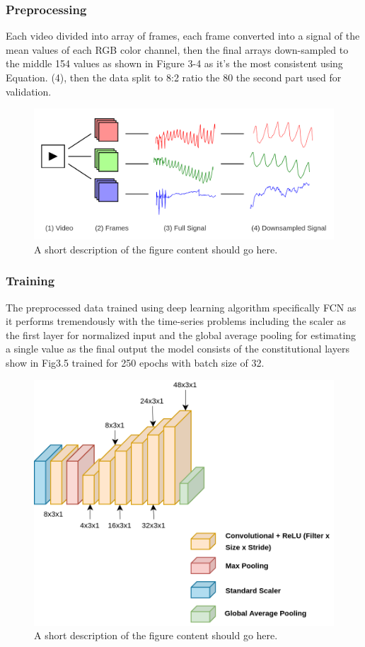 \documentclass{bmcart}
\begin{document}
\subsubsection*{Preprocessing}
Each video divided into array of frames, each frame converted into a signal of
the mean values of each RGB color channel, then the final arrays down-sampled to
the middle 154 values as shown in Figure 3-4 as it’s the most consistent using
Equation. (4), then the data split to 8:2 ratio the 80%
the second part used for validation.
\begin{figure}[h!]
  \includegraphics[width=.9\linewidth]{png_images/preporcessing.png}
  \caption{
      A short description of the figure content should go here.}
\end{figure}
\FloatBarrier

\subsubsection*{Training}
The preprocessed data trained using deep learning algorithm specifically FCN as
it performs tremendously with the time-series problems including the scaler as
the first layer for normalized input and the global average pooling for
estimating a single value as the final output the model consists of the
constitutional layers show in Fig3.5 trained for 250 epochs with batch size of
32.
\begin{figure}[h!]
  \includegraphics[width=.9\linewidth]{png_images/spo2_model.png}
  \caption{
      A short description of the figure content should go here.}
\end{figure}
\FloatBarrier
\end{document}

